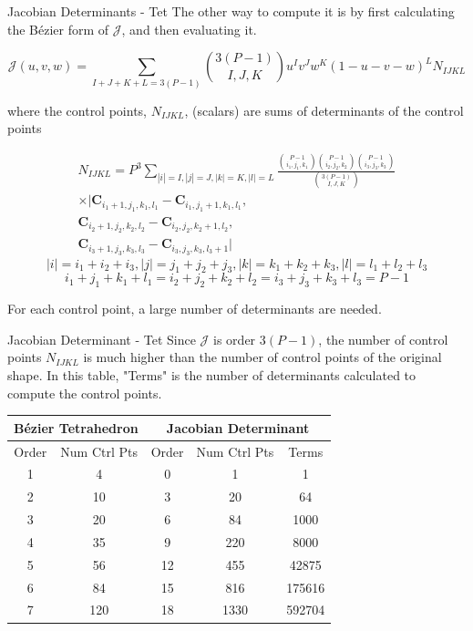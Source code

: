 \documentclass[12pt]{beamer}
\begin{document}
\begin{frame}{Jacobian Determinants - Tet}
The other way to compute it is by first calculating the B{\'e}zier form of $\mathcal{J}$, and then evaluating it. 
{
  \footnotesize

\[ \mathcal{J}(u,v,w) = \displaystyle\sum_{I+J+K+L=3(P-1)}  {3(P-1) \choose I,J,K}u^Iv^Jw^K(1-u-v-w)^LN_{IJKL}  \]
}where the control points, $N_{IJKL}$, (scalars) are sums of determinants of the control points
{
  \scriptsize
\begin{eqnarray*}
N_{IJKL} = P^3 \displaystyle\sum_{|i|=I,|j|=J,|k|=K,|l|=L} \frac{{P-1 \choose i_1,j_1,k_1}{P-1 \choose i_2,j_2,k_2}{P-1 \choose i_3,j_3,k_3}}{ {3(P-1) \choose I,J,K}} \\  \times|\mathbf{C}_{i_1+1,j_1,k_1,l_1}-\mathbf{C}_{i_1,j_1+1,k_1,l_1},\\\mathbf{C}_{i_2+1,j_2,k_2,l_2}-\mathbf{C}_{i_2,j_2,k_2+1,l_2},\\
\mathbf{C}_{i_3+1,j_3,k_3,l_3}-\mathbf{C}_{i_3,j_3,k_3,l_3+1}|
\end{eqnarray*}
\[|i| = i_1+i_2+i_3, |j| = j_1+j_2+j_3, |k| = k_1+k_2+k_3, |l| = l_1+l_2+l_3 \]
\[ i_1+j_1+k_1+l_1 = i_2+j_2+k_2+l_2 = i_3+j_3+k_3+l_3 =P-1\]

}
For each control point, a large number of determinants are needed.
\end{frame}
\begin{frame}{Jacobian Determinant - Tet}
Since $\mathcal{J}$ is order $3(P-1)$, the number of control points $N_{IJKL}$ is much higher than the number of control points of the original shape. In this table, "Terms" is the number of determinants calculated to compute the control points.

\begin{tabular}{|cc|ccc|}
\hline \multicolumn{2}{|c|}{B{\'e}zier Tetrahedron} & \multicolumn{3}{|c|}{Jacobian Determinant} \\ \hline
Order & Num Ctrl Pts & Order & Num Ctrl Pts & Terms \\ 
\hline 1 & 4 & 0 & 1 & 1 \\
2 & 10 & 3 & 20 & 64 \\
3 & 20 & 6 & 84 & 1000 \\
4 & 35 & 9 & 220 & 8000 \\
5 & 56 & 12 & 455 & 42875 \\
6 & 84 & 15 & 816 & 175616 \\
7 & 120 & 18 & 1330 & 592704 \\ \hline
\end{tabular}
\end{frame}
\end{document}

